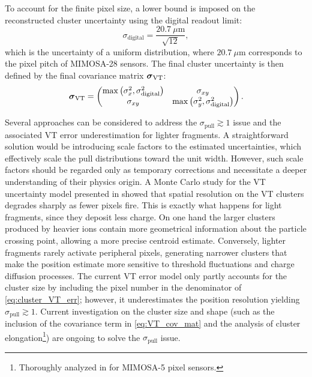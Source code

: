 To account for the finite pixel size, a lower bound is imposed on the reconstructed cluster uncertainty using the digital readout limit:
\begin{equation}
	\sigma_{\mathrm{digital}} =
	\frac{20.7~\mu\mathrm{m}}{\sqrt{12}},
\end{equation}
which is the uncertainty of a uniform distribution, where $20.7~\mu\mathrm{m}$ corresponds to the pixel pitch of MIMOSA-28 sensors. The final cluster uncertainty is then defined by the final covariance matrix $\boldsymbol{\sigma}_{\mathrm{VT}}$:
\begin{equation}
	\boldsymbol{\sigma}_{\mathrm{VT}} =
	\begin{pmatrix}
		\max\left(\sigma_x^2,\sigma_{\mathrm{digital}}^2\right) & \sigma_{xy} \\
		\sigma_{xy} & \max\left(\sigma_y^2,\sigma_{\mathrm{digital}}^2\right)
	\end{pmatrix}.
	\label{eq:VT_final_err}
\end{equation}

Several approaches can be considered to address the $\sigma_\text{pull}\gtrsim1$ issue and the associated VT error underestimation for lighter fragments. A straightforward solution would be introducing scale factors to the estimated uncertainties, which effectively scale the pull distributions toward the unit width. However, such scale factors should be regarded only as temporary corrections and necessitate a deeper understanding of their physics origin. A Monte Carlo study for the VT uncertainty model presented in \cite{Traini2026Meeting} showed that spatial resolution on the VT clusters degrades sharply as fewer pixels fire. This is exactly what happens for light fragments, since they deposit less charge. On one hand the larger clusters produced by heavier ions contain more geometrical information about the particle crossing point, allowing a more precise centroid estimate. Conversely, lighter fragments rarely activate peripheral pixels, generating narrower clusters that make the position estimate more sensitive to threshold fluctuations and charge diffusion processes. The current VT error model only partly accounts for the cluster size by including the pixel number in the denominator of \autoref{eq:cluster_VT_err}; however, it underestimates the position resolution yielding $\sigma_\text{pull}\gtrsim1$. Current investigation on the cluster size and shape (such as the inclusion of the covariance term in \autoref{eq:VT_cov_mat} and the analysis of cluster elongation\footnote{Thoroughly analyzed in \cite{Ma_czewski_2009} for MIMOSA-5 pixel sensors.}) are ongoing to solve the $\sigma_\text{pull}$ issue.
